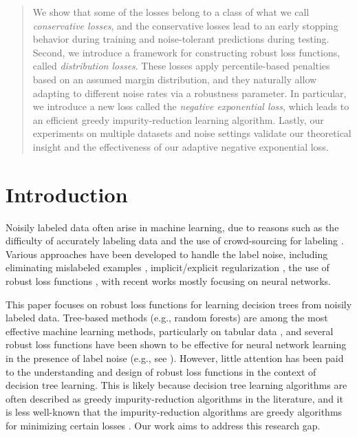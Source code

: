 \documentclass[letterpaper]{article} %
\begin{document}
\begin{abstract}
	We show that some of the losses belong to a class of what we call
	\emph{conservative losses}, 
    and the conservative losses %
    lead to
	an early stopping behavior during training and noise-tolerant predictions
	during testing.
	Second, we introduce a framework for constructing robust loss functions,
	called \emph{distribution losses}.
	These losses apply percentile-based penalties based on an assumed margin
	distribution, and they naturally allow adapting to different noise rates via a
	robustness parameter.
	In particular, we introduce a new loss called the \emph{negative exponential loss},
	which leads to an efficient greedy impurity-reduction learning
	algorithm.
	Lastly, our experiments on multiple datasets and noise settings validate our
	theoretical insight and the effectiveness of our adaptive negative exponential
	loss.
\end{abstract}



\section{Introduction}

Noisily labeled data often arise in machine learning, due to reasons such as 
the difficulty of accurately labeling data and
the use of crowd-sourcing for labeling \cite{song2022learning}.
Various approaches have been developed to handle the label noise, including 
eliminating mislabeled examples \cite{brodley1996identifying},
implicit/explicit regularization \cite{tanno2019learning,lukasik2020does},
the use of robust loss functions \cite{manwani2013noise,yang2019robust},
with recent works mostly focusing on neural networks.

This paper focuses on robust loss functions for learning decision trees from
noisily labeled data.
Tree-based methods (e.g., random forests) are among the most effective machine
learning methods, particularly on tabular data
\cite{grinsztajn2022tree,kaggle2021state},
and several robust loss functions have been shown to be effective for neural
network learning in the presence of label noise (e.g., see
\cite{ghosh2017robust,zhang2018generalized}).
However, little attention has been paid to the understanding and design of
robust loss functions in the context of decision tree learning.
This is likely because decision tree learning algorithms are often described as
greedy impurity-reduction algorithms in the literature, and it is less
well-known that the impurity-reduction algorithms are greedy algorithms for
minimizing certain losses \cite{yang2019robust,wilton2022positive}.
Our work aims to address this research gap.
\end{document}
